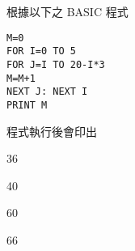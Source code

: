 \ifx\ntpcNinetyTwo\undefined[92學年基北區] \fi
根據以下之 BASIC 程式
  \begin{lstlisting}[language={[Visual]Basic}]
M=0
FOR I=0 TO 5
FOR J=I TO 20-I*3
M=M+1
NEXT J: NEXT I
PRINT M
  \end{lstlisting}
  程式執行後會印出
  \begin{optionlist}
  \item 36
  \item 40
  \item 60
  \item 66\label{ntpc-92-a41}
  \end{optionlist}